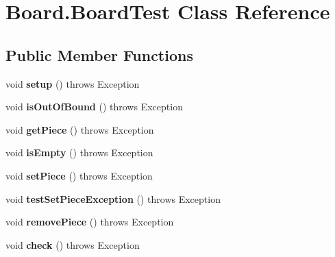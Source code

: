 \hypertarget{classBoard_1_1BoardTest}{\section{Board.\-Board\-Test Class Reference}
\label{classBoard_1_1BoardTest}
}
\subsection*{Public Member Functions}
\begin{DoxyCompactItemize}
\item 
\hypertarget{classBoard_1_1BoardTest_adae540eb02e71e280456c4f169830e30}{void {\bfseries setup} ()  throws Exception}\label{classBoard_1_1BoardTest_adae540eb02e71e280456c4f169830e30}

\item 
\hypertarget{classBoard_1_1BoardTest_a5712c82132f01dae3564fcfe5c5a8dbb}{void {\bfseries is\-Out\-Of\-Bound} ()  throws Exception }\label{classBoard_1_1BoardTest_a5712c82132f01dae3564fcfe5c5a8dbb}

\item 
\hypertarget{classBoard_1_1BoardTest_a418fc471dc9448638e352312f07ecac9}{void {\bfseries get\-Piece} ()  throws Exception }\label{classBoard_1_1BoardTest_a418fc471dc9448638e352312f07ecac9}

\item 
\hypertarget{classBoard_1_1BoardTest_ad20a5c811d5a040361413b00ab1086f0}{void {\bfseries is\-Empty} ()  throws Exception }\label{classBoard_1_1BoardTest_ad20a5c811d5a040361413b00ab1086f0}

\item 
\hypertarget{classBoard_1_1BoardTest_a812e290f6bb95a4d950ed5445d556f40}{void {\bfseries set\-Piece} ()  throws Exception }\label{classBoard_1_1BoardTest_a812e290f6bb95a4d950ed5445d556f40}

\item 
\hypertarget{classBoard_1_1BoardTest_a672fcbc8e906eaa083cd9c584bb08adf}{void {\bfseries test\-Set\-Piece\-Exception} ()  throws Exception}\label{classBoard_1_1BoardTest_a672fcbc8e906eaa083cd9c584bb08adf}

\item 
\hypertarget{classBoard_1_1BoardTest_af9c5bad34b8cfa72a4131ca92c06875b}{void {\bfseries remove\-Piece} ()  throws Exception }\label{classBoard_1_1BoardTest_af9c5bad34b8cfa72a4131ca92c06875b}

\item 
\hypertarget{classBoard_1_1BoardTest_a653f31e72b3b5aa6d775f3b7234a8207}{void {\bfseries check} ()  throws Exception }\label{classBoard_1_1BoardTest_a653f31e72b3b5aa6d775f3b7234a8207}


\end{DoxyCompactItemize}
